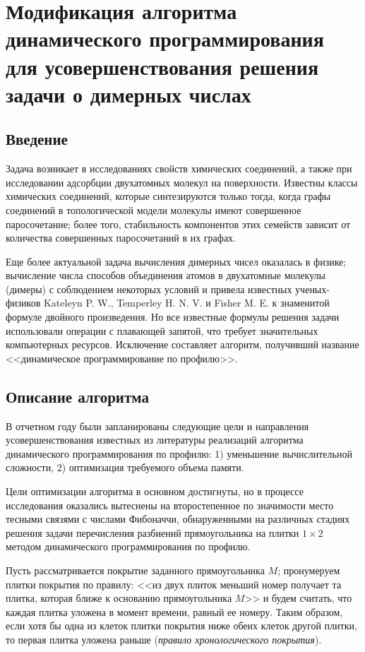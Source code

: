 \chapter{Модификация алгоритма динамического программирования для усовершенствования решения задачи о димерных числах}

\section{Введение}

Задача возникает в исследованиях свойств химических соединений, а также при исследовании адсорбции двухатомных молекул на поверхности. 
Известны классы химических соединений, которые синтезируются только тогда, когда графы соединений в топологической модели молекулы имеют совершенное паросочетание; более того, стабильность компонентов этих семейств зависит от количества совершенных паросочетаний в их графах.

Еще более актуальной задача вычисления димерных чисел оказалась в физике; вычисление числа способов объединения атомов в двухатомные молекулы (димеры) с соблюдением некоторых условий и привела известных ученых-физиков Kateleyn P. W., Temperley H. N. V. и Fisher M. E. к знаменитой формуле двойного произведения. Но все известные формулы решения задачи использовали операции с плавающей запятой, что требует значительных компьютерных ресурсов.
Исключение составляет алгоритм, получивший название <<динамическое программирование по профилю>>.

\section{Описание алгоритма}

В отчетном году были запланированы следующие цели и направления усовершенствования известных из литературы реализаций алгоритма динамического программирования по профилю: 1) уменьшение вычислительной сложности, 2) оптимизация требуемого объема памяти.

Цели оптимизации алгоритма в основном достигнуты, но в процессе исследования оказались вытеснены на второстепенное по значимости место тесными связями с числами Фибоначчи, обнаруженными на различных стадиях решения задачи перечисления разбиений прямоугольника на плитки $1\times 2$ методом динамического программирования по профилю.

Пусть рассматривается покрытие заданного прямоугольника $M$; пронумеруем плитки покрытия по правилу: <<из двух плиток меньший номер получает та плитка, которая ближе к основанию прямоугольника $M$>> и будем считать, что каждая плитка уложена в момент времени, равный ее номеру. Таким образом, если  хотя бы одна из клеток плитки покрытия ниже обеих клеток другой плитки, то первая плитка уложена раньше  (\textit{правило хронологического покрытия}).

